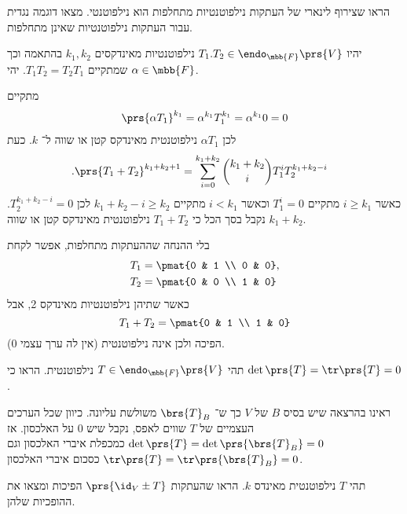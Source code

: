 \documentclass[a4paper,10pt,oneside,openany]{article}
\begin{document}
\begin{exercise}
הראו שצירוף לינארי של העתקות נילפוטנטיות מתחלפות הוא נילפוטנטי.
מצאו דוגמה נגדית עבור העתקות נילפוטנטיות שאינן מתחלפות.
\end{exercise}

\begin{solution}
יהיו
$T_1. T_2 \in \endo_{\mbb{F}}\prs{V}$
נילפוטנטיות מאינדקסים
$k_1, k_2$
בהתאמה וכך שמתקיים
$T_1 T_2 = T_2 T_1$.
יהי
$\alpha \in \mbb{F}$.

מתקיים
\begin{align*}
\prs{\alpha T_1}^{k_1} = \alpha^{k_1} T_1^{k_1} = \alpha^{k_1} 0 = 0
\end{align*}
לכן
$\alpha T_1$
נילפוטנטית מאינדקס קטן או שווה ל־%
$k$.
כעת
\begin{align*}
\text{.} \prs{T_1 + T_2}^{k_1 + k_2 + 1} &= \sum_{i=0}^{k_1 + k_2} \binom{k_1 + k_2}{i} T_1^i T_2^{k_1 + k_2 - i}
\end{align*}
כאשר
$i \geq k_1$
מתקיים
$T_1^i = 0$
וכאשר
$i < k_1$
מתקיים
$k_1 + k_2 - i \geq k_2$
לכן
$T_2^{k_1 + k_2 - i} = 0$.
נקבל בסך הכל כי
$T_1 + T_2$
נילפוטנטית מאינדקס קטן או שווה
$k_1 + k_2$.

בלי ההנחה שההעתקות מתחלפות, אפשר לקחת
\begin{align*}
T_1 &= \pmat{0 & 1 \\ 0 & 0}, \\
T_2 &= \pmat{0 & 0 \\ 1 & 0}
\end{align*}
כאשר שתיהן נילפוטנטיות מאינדקס 2, אבל
\[T_1 + T_2 = \pmat{0 & 1 \\ 1 & 0}\]
הפיכה ולכן אינה נילפוטנטית (אין לה ערך עצמי
$0$).
\end{solution}

\begin{exercise}
תהי
$T \in \endo_{\mbb{F}}\prs{V}$
נילפוטנטית.
הראו כי
$\det\prs{T} = \tr\prs{T} = 0$.
\end{exercise}

\begin{solution}
ראינו בהרצאה שיש בסיס
$B$
של
$V$
כך ש־%
$\brs{T}_B$
משולשת עליונה.
כיוון שכל הערכים העצמיים של
$T$
שווים לאפס, נקבל שיש
$0$
על האלכסון.
אז
$\det\prs{T} = \det\prs{\brs{T}_B} = 0$
כמכפלת איברי האלכסון וגם
$\tr\prs{T} = \tr\prs{\brs{T}_B} = 0$
כסכום איברי האלכסון.
\end{solution}

\begin{exercise}
תהי
$T$
נילפוטנטית מאינדס
$k$.
הראו שהעתקות
$\prs{\id_V \pm T}$
הפיכות ומצאו את ההופכיות שלהן.
\end{exercise}
\end{document}
